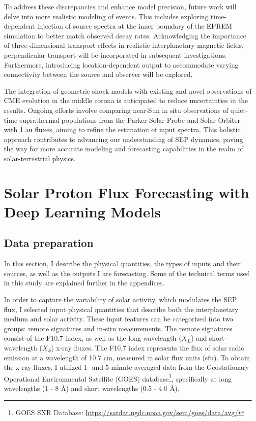 To address these discrepancies and enhance model precision, future work will delve into more realistic modeling of events. This includes exploring time-dependent injection of source spectra at the inner boundary of the EPREM simulation to better match observed decay rates. Acknowledging the importance of three-dimensional transport effects in realistic interplanetary magnetic fields, perpendicular transport will be incorporated in subsequent investigations. Furthermore, introducing location-dependent output to accommodate varying connectivity between the source and observer will be explored.

The integration of geometric shock models with existing and novel observations of CME evolution in the middle corona is anticipated to reduce uncertainties in the results. Ongoing efforts involve comparing near-Sun in situ observations of quiet-time suprathermal populations from the Parker Solar Probe and Solar Orbiter with 1 au fluxes, aiming to refine the estimation of input spectra. This holistic approach contributes to advancing our understanding of SEP dynamics, paving the way for more accurate modeling and forecasting capabilities in the realm of solar-terrestrial physics.


\section{Solar Proton Flux Forecasting with Deep Learning Models}
\subsection{Data preparation}
In this section, I describe the physical quantities, the types of inputs and their sources, as well as the outputs I are forecasting.
Some of the technical terms used in this study are explained further in the appendices.

In order to capture the variability of solar activity, which modulates the SEP flux, I selected input physical quantities that describe both the interplanetary medium and solar activity. These input features can be categorized into two groups: remote signatures and in-situ measurements.
The remote signatures consist of the F10.7 index, as well as the long-wavelength ($X_L$) and short-wavelength ($X_S$) x-ray fluxes. The F10.7 index represents the flux of solar radio emission at a wavelength of 10.7 cm, measured in solar flux units (sfu). To obtain the x-ray fluxes, I utilized 1- and 5-minute averaged data from the Geostationary Operational Environmental Satellite (GOES) database\footnote{GOES SXR Database: \url{https://satdat.ngdc.noaa.gov/sem/goes/data/avg/}}, specifically at long wavelengths (1 - 8 \AA) and short wavelengths (0.5 - 4.0 \AA).

